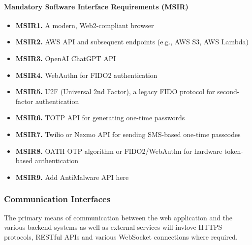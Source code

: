 \paragraph{Mandatory Software Interface Requirements (MSIR)}
\begin{itemize}
    \item \textbf{MSIR1.} A modern, Web2-compliant browser
    \item \textbf{MSIR2.} AWS API and subsequent endpoints (e.g., AWS S3, AWS Lambda)
    \item \textbf{MSIR3.} OpenAI ChatGPT API
    \item \textbf{MSIR4.} WebAuthn for FIDO2 authentication
    \item \textbf{MSIR5.} U2F (Universal 2nd Factor), a legacy FIDO protocol for second-factor authentication
    \item \textbf{MSIR6.} TOTP API for generating one-time passwords
    \item \textbf{MSIR7.} Twilio or Nexmo API for sending SMS-based one-time passcodes
    \item \textbf{MSIR8.} OATH OTP algorithm or FIDO2/WebAuthn for hardware token-based authentication
     \item \textbf{MSIR9.} Add AntiMalware API here

\end{itemize}




\subsubsection{Communication Interfaces}
The primary means of communication between the web application and the various backend systems as well as external services will invlove HTTPS protocols, RESTful APIs and various WebSocket connections where required. 

